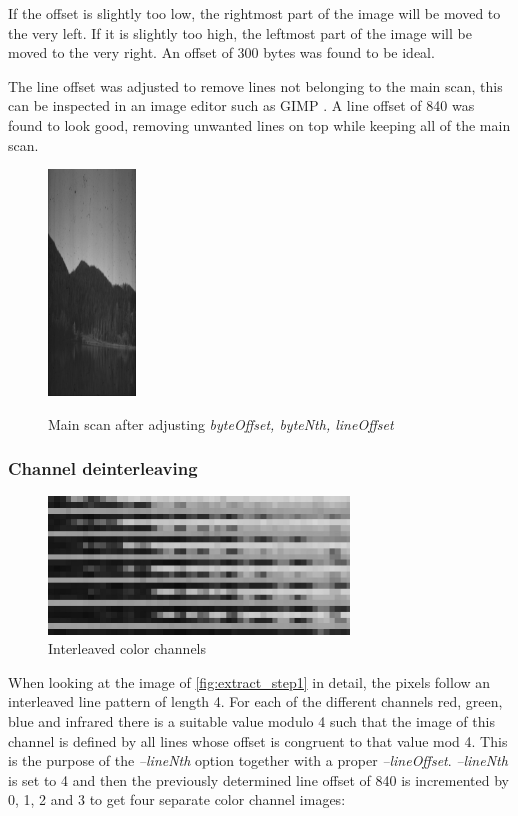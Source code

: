 \documentclass{article}
\begin{document}
If the offset is slightly too low, the rightmost part of the image will be moved to the very left.
If it is slightly too high, the leftmost part of the image will be moved to the very right.
An offset of 300 bytes was found to be ideal.

The line offset was adjusted to remove lines not belonging to the main scan, this
can be inspected in an image editor such as GIMP \cite{gimp}. A line offset of 840 was found to
look good, removing unwanted lines on top while keeping all of the main scan.

\begin{figure}[H]
  \caption{Main scan after adjusting \it{byteOffset, byteNth, lineOffset}}
  \centering
  \includegraphics[height=6cm]{images/extract_2.jpg}
  \label{fig:extract_step1}
\end{figure}

\subsubsection{Channel deinterleaving}
\label{ssec:deinterleave}

\begin{figure}[H]
  \caption{Interleaved color channels}
  \centering
  \includegraphics[width=8cm]{images/extract_5.jpg}
\end{figure}

When looking at the image of \autoref{fig:extract_step1} in detail,
the pixels follow an interleaved line pattern of length 4. For each of
the different channels red, green, blue and infrared there is a suitable
value modulo 4 such that the image of this channel is defined by all lines
whose offset is congruent to that value mod 4. This is the purpose of the
{\it --lineNth} option together with a proper {\it --lineOffset}.
{\it --lineNth} is set to 4 and then the previously determined
line offset of 840 is incremented by 0, 1, 2 and 3 to get four separate
color channel images:
\end{document}
